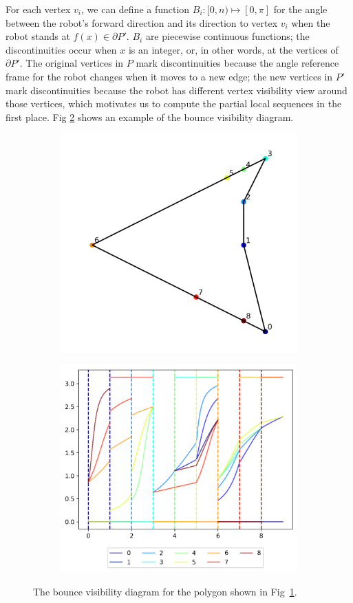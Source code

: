 \documentclass[letterpaper, 10 pt, conference]{ieeeconf}  %
\begin{document}
For each vertex $v_i$, we can define a function $B_i: [0, n) \mapsto [0, \pi]$
for the angle between the robot's forward direction and its direction to vertex
$v_i$ when the robot stands at $f(x)\in \partial P'$. $B_i$ are piecewise
continuous functions; the discontinuities occur when $x$ is an integer, or, in
other words, at the vertices of $\partial P'$. The original vertices in $P$ mark
discontinuities because the angle reference frame for the robot changes when it
moves to a new edge; the new vertices in $P'$ mark discontinuities because the
robot has different vertex visibility view around those vertices, which
motivates us to compute the partial local sequences in the first place.
Fig \ref{fig:bvd} shows an example of the bounce visibility diagram.

\begin{figure}

\centering
\begin{subfigure}{0.25\textwidth}
\centering
\includegraphics[width=0.7\linewidth]{images/color_pent.png}
\label{fig:color_pent}
\end{subfigure}%
\begin{subfigure}{0.25\textwidth}
\centering
\includegraphics[width=0.8\linewidth]{images/bvd.png}
\end{subfigure}
\caption{The bounce visibility diagram for the polygon shown in Fig~\ref{fig:color_pent}. }
\label{fig:bvd}

\end{figure}
\end{document}

